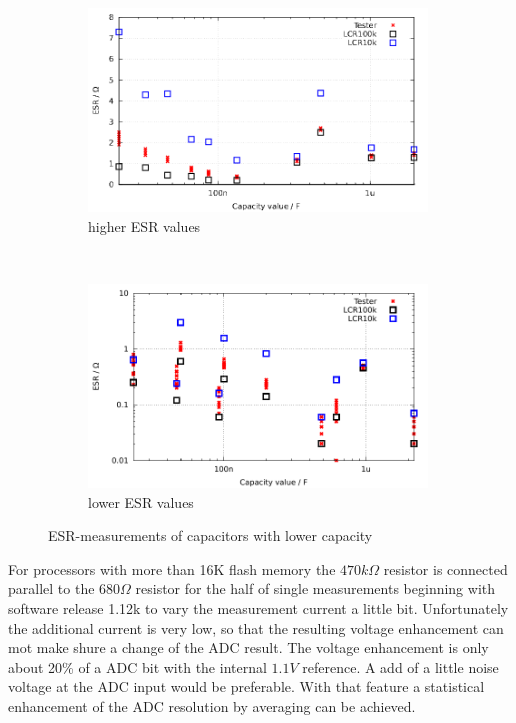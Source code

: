 \begin{figure}[H]
  \begin{subfigure}[b]{9cm}
    \centering
    \includegraphics[width=9cm]{../GNU/Cesr_22n.pdf}
    \caption{higher ESR values}
  \end{subfigure}
  ~
  \begin{subfigure}[b]{9cm}
    \centering
    \includegraphics[width=9cm]{../GNU/Cesr_22n_low.pdf}
    \caption{lower ESR values}
  \end{subfigure}
  \caption{ESR-measurements of capacitors with lower capacity}
  \label{pic:Cesr_22n}
\end{figure}
 
For processors with more than 16K flash memory the \(470k\Omega\) resistor is connected parallel to the \(680\Omega\) resistor
for the half of single measurements beginning with software release 1.12k to vary the measurement current a little bit.
Unfortunately the additional current is very low, so that the resulting voltage enhancement can mot make shure a
change of the ADC result.
The voltage enhancement is only about 20\% of a ADC bit with the internal \(1.1V\) reference.
A add of a little noise voltage at the ADC input would be preferable.
With that feature a statistical enhancement of the ADC resolution by averaging can be achieved.
 


